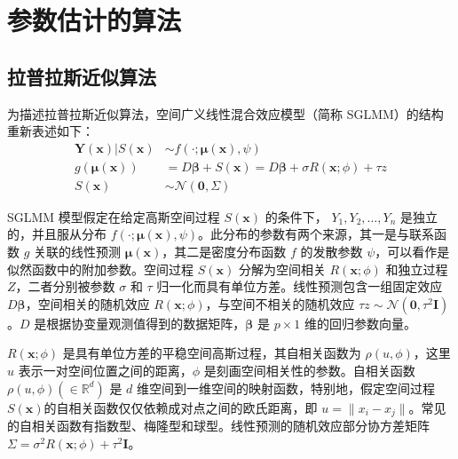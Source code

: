 \documentclass[12pt,a4paper,UTF8,twoside]{book}
\theoremstyle{definition}
\theoremstyle{definition}
\theoremstyle{definition}
\theoremstyle{remark}
\begin{document}
\hypertarget{sec:algrithms}{%
\section{参数估计的算法}\label{sec:algrithms}}

\hypertarget{subsec:LA}{%
\subsection{拉普拉斯近似算法}\label{subsec:LA}}

为描述拉普拉斯近似算法，空间广义线性混合效应模型（简称
SGLMM）的结构重新表述如下： \begin{equation}
\begin{aligned}
\mathbf{Y(x)} | S(\mathbf{x}) & \sim  f(\cdot;\boldsymbol{\mu(x)},\psi) \\
g(\boldsymbol{\mu}(\mathbf{x})) & =  D\boldsymbol{\beta} + S(\mathbf{x}) 
                         = D\boldsymbol{\beta} + \sigma R(\mathbf{x};\phi) + \tau z \\
S(\mathbf{x}) & \sim  \mathcal{N}(\mathbf{0},\Sigma)
\end{aligned} \label{eq:sglmm}
\end{equation}

\noindent SGLMM 模型假定在给定高斯空间过程 \(S(\mathbf{x})\) 的条件下，
\(Y_1,Y_2,\ldots,Y_n\) 是独立的，并且服从分布
\(f(\cdot;\boldsymbol{\mu}(\mathbf{x}),\psi)\)。此分布的参数有两个来源，其一是与联系函数
\(g\) 关联的线性预测
\(\boldsymbol{\mu}(\mathbf{x})\)，其二是密度分布函数 \(f\) 的发散参数
\(\psi\)，可以看作是似然函数中的附加参数。空间过程 \(S(\mathbf{x})\)
分解为空间相关 \(R(\mathbf{x};\phi)\) 和独立过程 \(Z\)，二者分别被参数
\(\sigma\) 和 \(\tau\) 归一化而具有单位方差。线性预测包含一组固定效应
\(D\boldsymbol{\beta}\)，空间相关的随机效应
\(R(\mathbf{x};\phi)\)，与空间不相关的随机效应
\(\tau z \sim \mathcal{N}(\mathbf{0},\tau^2\mathbf{I})\)。\(D\)
是根据协变量观测值得到的数据矩阵，\(\boldsymbol{\beta}\) 是
\(p \times 1\) 维的回归参数向量。

\(R(\mathbf{x};\phi)\) 是具有单位方差的平稳空间高斯过程，其自相关函数为
\(\rho(u,\phi)\)，这里 \(u\) 表示一对空间位置之间的距离，\(\phi\)
是刻画空间相关性的参数。自相关函数 \(\rho(u,\phi) (\in \mathbb{R}^d)\)
是 \(d\) 维空间到一维空间的映射函数，特别地，假定空间过程
\(S(\mathbf{x})\)的自相关函数仅仅依赖成对点之间的欧氏距离，即
\(u =\|x_i - x_j\|\)。常见的自相关函数有指数型、梅隆型和球型。线性预测的随机效应部分协方差矩阵
\(\Sigma = \sigma^2 R(\mathbf{x};\phi) + \tau^2\mathbf{I}\)。
\end{document}
